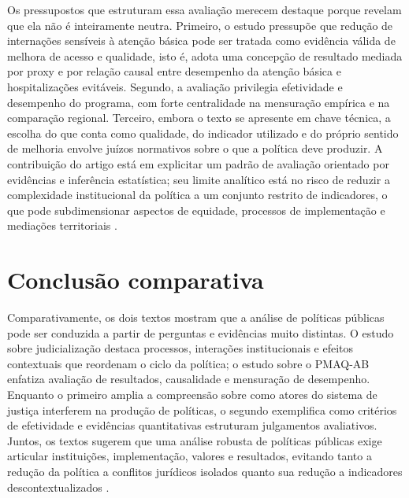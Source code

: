 \documentclass[12pt,a4paper]{article}
\begin{document}
Os pressupostos que estruturam essa avaliação merecem destaque porque revelam que ela não é inteiramente neutra. Primeiro, o estudo pressupõe que redução de internações sensíveis à atenção básica pode ser tratada como evidência válida de melhora de acesso e qualidade, isto é, adota uma concepção de resultado mediada por proxy e por relação causal entre desempenho da atenção básica e hospitalizações evitáveis. Segundo, a avaliação privilegia efetividade e desempenho do programa, com forte centralidade na mensuração empírica e na comparação regional. Terceiro, embora o texto se apresente em chave técnica, a escolha do que conta como qualidade, do indicador utilizado e do próprio sentido de melhoria envolve juízos normativos sobre o que a política deve produzir. A contribuição do artigo está em explicitar um padrão de avaliação orientado por evidências e inferência estatística; seu limite analítico está no risco de reduzir a complexidade institucional da política a um conjunto restrito de indicadores, o que pode subdimensionar aspectos de equidade, processos de implementação e mediações territoriais \parencite{soares2020_uma_avaliacao}.



\section{Conclusão comparativa}
\label{sec:org29ed642}

Comparativamente, os dois textos mostram que a análise de políticas públicas pode ser conduzida a partir de perguntas e evidências muito distintas. O estudo sobre judicialização destaca processos, interações institucionais e efeitos contextuais que reordenam o ciclo da política; o estudo sobre o PMAQ-AB enfatiza avaliação de resultados, causalidade e mensuração de desempenho. Enquanto o primeiro amplia a compreensão sobre como atores do sistema de justiça interferem na produção de políticas, o segundo exemplifica como critérios de efetividade e evidências quantitativas estruturam julgamentos avaliativos. Juntos, os textos sugerem que uma análise robusta de políticas públicas exige articular instituições, implementação, valores e resultados, evitando tanto a redução da política a conflitos jurídicos isolados quanto sua redução a indicadores descontextualizados \parencite{rodrigues2022_efeitos_judicializacao,soares2020_uma_avaliacao}.

\printbibliography
\end{document}
